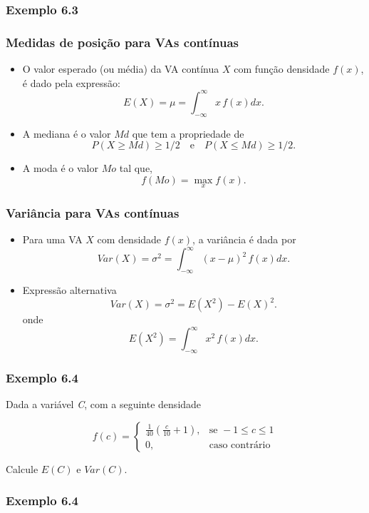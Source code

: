 \documentclass[11pt]{beamer}
\begin{document}
\begin{frame}
\frametitle{Exemplo 6.3}
\end{frame}


\begin{frame}
\frametitle{Medidas de posição para VAs contínuas}

\begin{itemize}
\item
  O valor esperado (ou média) da VA contínua \(X\) com função densidade
  \(f(x)\), é dado pela expressão:
  \[E(X) = \mu = \int_{-\infty}^{\infty} x\, f(x) dx.\]
\item
  A mediana é o valor \(Md\) que tem a propriedade de
  \[P(X \geq Md) \geq 1/2 \quad \text{e} \quad P(X \leq Md) \geq 1/2.\]
\item
  A moda é o valor \(Mo\) tal que, \[f(Mo) = \max_{x} f(x).\]
\end{itemize}
\end{frame}

\begin{frame}
\frametitle{Variância para VAs contínuas}

\begin{itemize}
\item
  Para uma VA \(X\) com densidade \(f(x)\), a variância é dada por
  \[Var(X) = \sigma^2 = \int_{-\infty}^{\infty} (x - \mu)^2 \, f(x) dx.\]
\item
  Expressão alternativa \[Var(X) = \sigma^2 = E(X^2) - E(X)^2.\] onde
  \[E(X^2) = \int_{-\infty}^{\infty} x^2 \, f(x) dx.\]
\end{itemize}
\end{frame}

\begin{frame}
\frametitle{Exemplo 6.4}

Dada a variável \textit{C}, com a seguinte densidade

\[
f(c)=
\begin{cases}
\frac{1}{40}(\frac{c}{10}+1), & \text{se } -1 \leq c \leq 1 \\
0,              & \text{caso contrário}
\end{cases}
\]

Calcule \(E(C)\) e \(Var(C)\).
\vspace{1in}
\end{frame}

\begin{frame}
\frametitle{Exemplo 6.4}
\end{frame}
\end{document}
